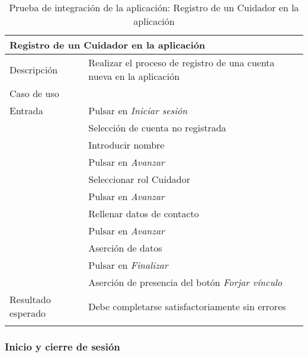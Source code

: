 \newpage
\begin{longtable}{|p{} p{}|}
    \hline
    \multicolumn{2}{|l|}{\textbf{Registro de un Cuidador en la aplicación}} \\ \hline 
    Descripción                 & Realizar el proceso de registro de una cuenta nueva en la aplicación \\ \hline
    Caso de uso                 & \nameref{cu:registro} \\ \hline
    Entrada                     & Pulsar en \emph{Iniciar sesión} \\
                                & Selección de cuenta no registrada \\ 
                                & Introducir nombre \\
                                & Pulsar en \emph{Avanzar} \\
                                & Seleccionar rol Cuidador \\
                                & Pulsar en \emph{Avanzar} \\
                                & Rellenar datos de contacto \\
                                & Pulsar en \emph{Avanzar} \\
                                & Aserción de datos \\
                                & Pulsar en \emph{Finalizar} \\
                                & Aserción de presencia del botón \emph{Forjar vínculo} \\ \hline
    Resultado esperado          & Debe completarse satisfactoriamente sin errores \\ \hline
    \caption{Prueba de integración de la aplicación: Registro de un Cuidador en la aplicación}
    \label{cp:i:app:registro_cuidador}
\end{longtable}

\subsubsection{Inicio y cierre de sesión}


